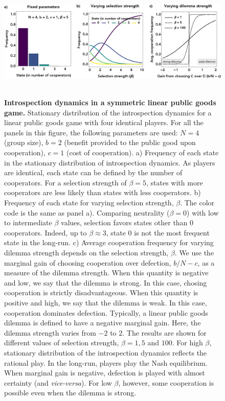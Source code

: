 \documentclass[11pt]{article}
\theoremstyle{plainCl1}
\theoremstyle{plainCl2}
\begin{document}
\begin{figure}
\centering
\includegraphics[width =  \textwidth]{figures/Fig1.eps}~\\[0.4cm]
\caption{\onehalfspacing
\textbf{Introspection dynamics in a symmetric linear public goods game.}
Stationary distribution of the introspection dynamics for a linear public goods game with four identical players. For all the panels in this figure, the following parameters are used: $N = 4$ (group size), $b = 2$ (benefit provided to the public good upon cooperation), $c = 1$ (cost of cooperation). a) Frequency of each state in the stationary distribution of introspection dynamics. As players are identical, each state can be defined by the number of cooperators. For a selection strength of $\beta = 5$, states with more cooperators are less likely than states with less cooperators. b) Frequency of each state for varying selection strength, $\beta$. The color code is the same as panel a). Comparing neutrality ($\beta = 0$) with low to intermediate $\beta$ values, selection favors states other than 0 cooperators. Indeed, up to $\beta \approx 3$, state $0$ is not the most frequent state in the long-run. c) Average cooperation frequency for varying dilemma strength depends on the selection strength, $\beta$. We use the marginal gain of choosing cooperation over defection, $b/N - c$, as a measure of the dilemma strength. When this quantity is negative and low, we say that the dilemma is strong. In this case, chosing cooperation is strictly disadvantageous. When this quantity is positive and high, we say that the dilemma is weak. In this case, cooperation dominates defection. Typically, a linear public goods dilemma is defined to have a negative marginal gain. Here, the dilemma strength varies from $-2$ to $2$. The results are shown for different values of selection strength, $\beta = 1, 5$ and $100$. For high $\beta$, stationary distribution of the introspection dynamics reflects the rational play. In the long-run, players play the Nash equilibrium. When marginal gain is negative, defection is played with almost certainty (and \emph{vice-versa}). For low $\beta$, however, some cooperation is possible even when the dilemma is strong. }
\label{Fig:LPGG-symmetric}
\end{figure}
\end{document}
